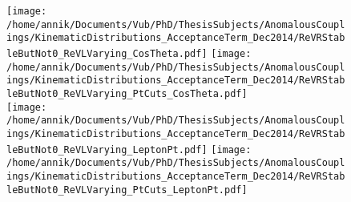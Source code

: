 \begin{figure}[!h]
 \centering
 \texttt{[image: /home/annik/Documents/Vub/PhD/ThesisSubjects/AnomalousCouplings/KinematicDistributions\_AcceptanceTerm\_Dec2014/ReVRStableButNot0\_ReVLVarying\_CosTheta.pdf]}
 \texttt{[image: /home/annik/Documents/Vub/PhD/ThesisSubjects/AnomalousCouplings/KinematicDistributions\_AcceptanceTerm\_Dec2014/ReVRStableButNot0\_ReVLVarying\_PtCuts\_CosTheta.pdf]}\\
 \texttt{[image: /home/annik/Documents/Vub/PhD/ThesisSubjects/AnomalousCouplings/KinematicDistributions\_AcceptanceTerm\_Dec2014/ReVRStableButNot0\_ReVLVarying\_LeptonPt.pdf]}
 \texttt{[image: /home/annik/Documents/Vub/PhD/ThesisSubjects/AnomalousCouplings/KinematicDistributions\_AcceptanceTerm\_Dec2014/ReVRStableButNot0\_ReVLVarying\_PtCuts\_LeptonPt.pdf]}\\
 \caption{}
 \label{fig::KinChangeNot0}
\end{figure}

